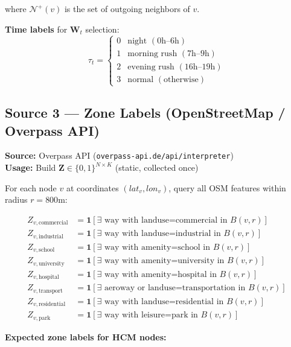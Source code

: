 \documentclass[12pt,a4paper]{article}
\begin{document}
where $\mathcal{N}^+(v)$ is the set of outgoing neighbors of $v$.

\textbf{Time labels} for $\mathbf{W}_t$ selection:
\begin{equation}
\tau_t = \begin{cases}
0 & \text{night } (0\text{h}–6\text{h}) \\
1 & \text{morning rush } (7\text{h}–9\text{h}) \\
2 & \text{evening rush } (16\text{h}–19\text{h}) \\
3 & \text{normal } (\text{otherwise})
\end{cases}
\end{equation}

\subsection{Source 3 — Zone Labels (OpenStreetMap / Overpass API)}

\textbf{Source:} Overpass API (\texttt{overpass-api.de/api/interpreter})\\
\textbf{Usage:} Build $\mathbf{Z} \in \{0,1\}^{N \times K}$ (static, collected once)

For each node $v$ at coordinates $(lat_v, lon_v)$, query all OSM features within
radius $r = 800$m:

\begin{align}
Z_{v,\text{commercial}} &= \mathbf{1}[\exists \text{ way with landuse=commercial in } B(v, r)] \\
Z_{v,\text{industrial}}  &= \mathbf{1}[\exists \text{ way with landuse=industrial in } B(v, r)] \\
Z_{v,\text{school}}      &= \mathbf{1}[\exists \text{ way with amenity=school in } B(v, r)] \\
Z_{v,\text{university}}  &= \mathbf{1}[\exists \text{ way with amenity=university in } B(v, r)] \\
Z_{v,\text{hospital}}    &= \mathbf{1}[\exists \text{ way with amenity=hospital in } B(v, r)] \\
Z_{v,\text{transport}}   &= \mathbf{1}[\exists \text{ aeroway or landuse=transportation in } B(v, r)] \\
Z_{v,\text{residential}} &= \mathbf{1}[\exists \text{ way with landuse=residential in } B(v, r)] \\
Z_{v,\text{park}}        &= \mathbf{1}[\exists \text{ way with leisure=park in } B(v, r)]
\end{align}

\textbf{Expected zone labels for HCM nodes:}
\end{document}
